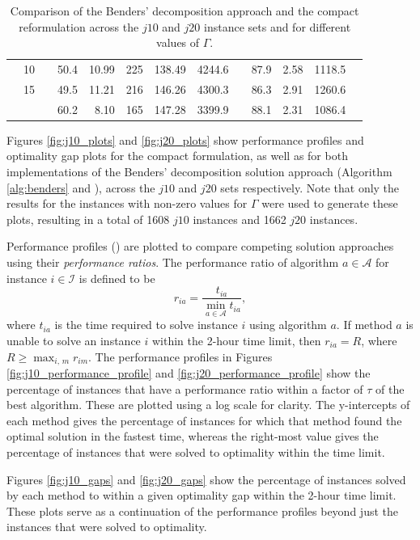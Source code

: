 \documentclass[a4paper,abstracton]{scrartcl}
\begin{document}
\begin{table}[h]
{\begin{tabular}{lrrrrrrrrrrrr}
			       & 10   & & 50.4     & 10.99    & 225          & 138.49        & 4244.6       & & 87.9       & 2.58       & 1118.5          \\
			       & 15   & & 49.5     & 11.21    & 216          & 146.26        & 4300.3       & & 86.3       & 2.91       & 1260.6          \\
		     \cline{4-8} \cline{10-12}
			       &      & & 60.2	   & 8.10     & 165	     & 147.28	     & 3399.9       & & 88.1       & 2.31       & 1086.4          \\
		     \hline \hline
\end{tabular}
}
\caption{Comparison of the Benders' decomposition approach and the compact reformulation across the $j10$ and $j20$ instance sets and for different values of $\Gamma$.}
\label{table:benders_vs_compact}
\end{table}

Figures \ref{fig:j10_plots} and \ref{fig:j20_plots} show performance profiles and optimality gap plots for the compact formulation, as well as for both implementations of the Benders' decomposition solution approach (Algorithm \ref{alg:benders} and \cite{balouka2021robust}), across the $j10$ and $j20$ sets respectively. Note that only the results for the instances with non-zero values for $\Gamma$ were used to generate these plots, resulting in a total of 1608 $j10$ instances and 1662 $j20$ instances. 

Performance profiles (\cite{dolan2002benchmarking}) are plotted to compare competing solution approaches using their \textit{performance ratios}. The performance ratio of algorithm $a\in \mathcal{A}$ for instance $i\in \mathcal{I}$ is defined to be 
$$r_{ia}=\frac{t_{ia}}{\min_{a\in \mathcal{A}} t_{ia}},$$
where $t_{ia}$ is the time required to solve instance $i$ using algorithm $a$. If method $a$ is unable to solve an instance $i$ within the 2-hour time limit, then $r_{ia}=R$, where $R\geq \max_{i,\,m}r_{im}$. The performance profiles in Figures \ref{fig:j10_performance_profile} and \ref{fig:j20_performance_profile} show the percentage of instances that have a performance ratio within a factor of $\tau$ of the best algorithm. These are plotted using a log scale for clarity. The y-intercepts of each method gives the percentage of instances for which that method found the optimal solution in the fastest time, whereas the right-most value gives the percentage of instances that were solved to optimality within the time limit.

Figures \ref{fig:j10_gaps} and \ref{fig:j20_gaps} show the percentage of instances solved by each method to within a given optimality gap within the 2-hour time limit. These plots serve as a continuation of the performance profiles beyond just the instances that were solved to optimality.
\end{document}
